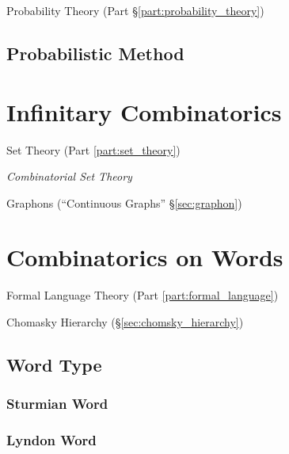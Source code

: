 Probability Theory (Part \S\ref{part:probability_theory})



\subsection{Probabilistic Method}\label{sec:probabilistic_method}



\section{Infinitary Combinatorics}\label{sec:infinitary_combinatorics}

Set Theory (Part \ref{part:set_theory})

\emph{Combinatorial Set Theory}

Graphons (``Continuous Graphs'' \S\ref{sec:graphon})



\section{Combinatorics on Words}\label{sec:combinatorics_on_words}

Formal Language Theory (Part \ref{part:formal_language})

Chomasky Hierarchy (\S\ref{sec:chomsky_hierarchy})



\subsection{Word Type}\label{sec:word_type}

\subsubsection{Sturmian Word}\label{sec:sturmian_word}

\subsubsection{Lyndon Word}\label{sec:lyndon_word}



